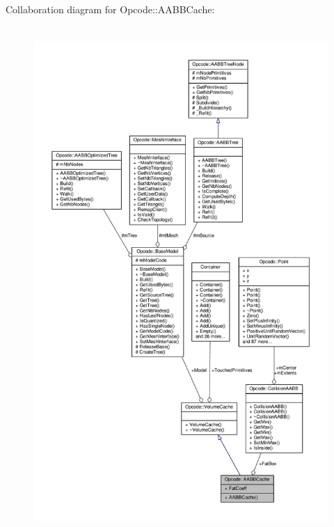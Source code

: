 Collaboration diagram for Opcode\+:\+:A\+A\+B\+B\+Cache\+:
\nopagebreak
\begin{figure}[H]
\begin{center}
\leavevmode
\includegraphics[height=550pt]{d5/d0f/structOpcode_1_1AABBCache__coll__graph}
\end{center}
\end{figure}
